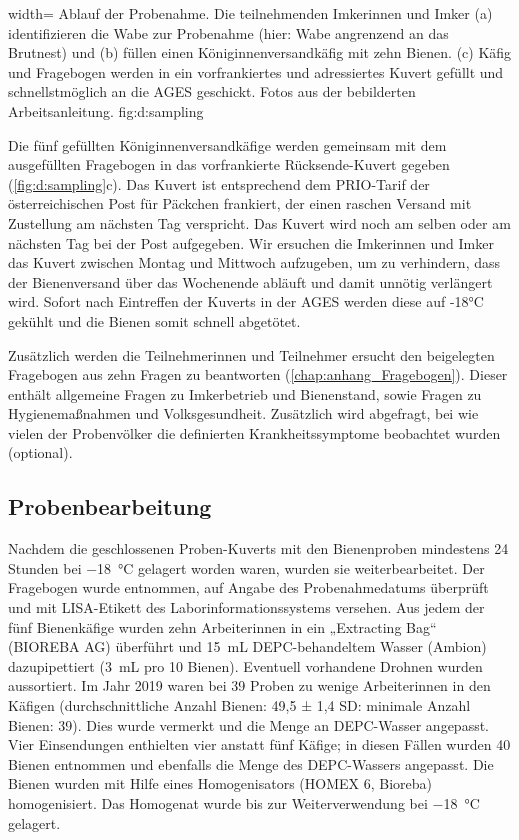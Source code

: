  {width=\textwidth} %
  {Ablauf der Probenahme. Die teilnehmenden Imkerinnen und Imker (a) identifizieren die Wabe zur Probenahme (hier: Wabe angrenzend an das Brutnest) und (b) füllen einen Königinnenversandkäfig mit zehn Bienen. (c) Käfig und Fragebogen werden in ein vorfrankiertes und adressiertes Kuvert gefüllt und schnellstmöglich an die AGES geschickt. Fotos aus der bebilderten Arbeitsanleitung.} %
  {} %
  {fig:d:sampling} %


Die fünf gefüllten Königinnenversandkäfige werden gemeinsam mit dem ausgefüllten Fragebogen in das vorfrankierte Rücksende-Kuvert gegeben (\cref{fig:d:sampling}c). Das Kuvert ist entsprechend dem PRIO-Tarif der österreichischen Post für Päckchen frankiert, der einen raschen Versand mit Zustellung am nächsten Tag verspricht. Das Kuvert wird noch am selben oder am nächsten Tag bei der Post aufgegeben. Wir ersuchen die Imkerinnen und Imker das Kuvert zwischen Montag und Mittwoch aufzugeben, um zu verhindern, dass der Bienenversand über das Wochenende abläuft und damit unnötig verlängert wird. Sofort nach Eintreffen der Kuverts in der AGES werden diese auf -18°C gekühlt und die Bienen somit schnell abgetötet.

Zusätzlich werden die Teilnehmerinnen und Teilnehmer ersucht den beigelegten Fragebogen aus zehn Fragen zu beantworten (\cref{chap:anhang_Fragebogen}). Dieser enthält allgemeine Fragen zu Imkerbetrieb und Bienenstand, sowie Fragen zu Hygienemaßnahmen und Volksgesundheit. Zusätzlich wird abgefragt, bei wie vielen der Probenvölker die definierten Krankheitssymptome beobachtet wurden (optional).


\subsection{Probenbearbeitung} \label{chap:probenbearbeitung}

Nachdem die geschlossenen Proben-Kuverts mit den Bienenproben mindestens 24 Stunden bei \SI{-18}{\degreeCelsius} gelagert worden waren, wurden sie weiterbearbeitet. Der Fragebogen wurde entnommen, auf Angabe des Probenahmedatums überprüft und mit LISA-Etikett des Laborinformationssystems versehen. Aus jedem der fünf Bienenkäfige wurden zehn Arbeiterinnen in ein „Extracting Bag“ (BIOREBA AG) überführt und \SI{15}{\milli\liter} DEPC-behandeltem Wasser (Ambion) dazupipettiert (\SI{3}{\milli\liter} pro 10 Bienen). Eventuell vorhandene Drohnen wurden aussortiert. Im Jahr 2019 waren bei 39 Proben zu wenige Arbeiterinnen in den Käfigen (durchschnittliche Anzahl Bienen: 49,5 ± 1,4 SD: minimale Anzahl Bienen: 39). Dies wurde vermerkt und die Menge an DEPC-Wasser angepasst. Vier Einsendungen enthielten vier anstatt fünf Käfige; in diesen Fällen wurden 40 Bienen entnommen und ebenfalls die Menge des DEPC-Wassers angepasst. Die Bienen wurden mit Hilfe eines Homogenisators (HOMEX 6, Bioreba) homogenisiert. Das Homogenat wurde bis zur Weiterverwendung bei \SI{-18}{\degreeCelsius} gelagert.

